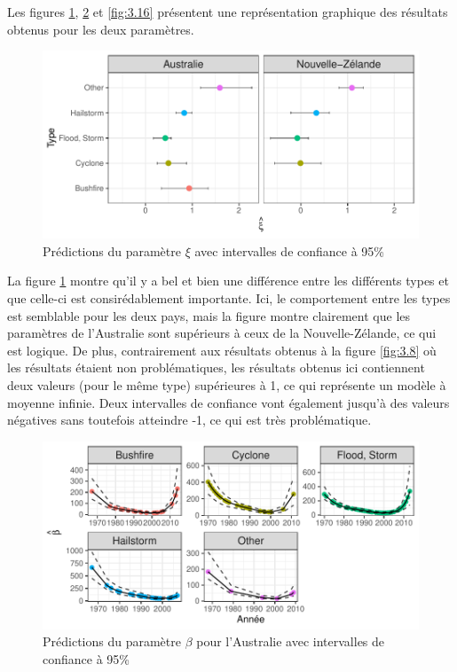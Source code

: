 Les figures \ref{fig:3.14}, \ref{fig:3.15} et \ref{fig:3.16} présentent une représentation graphique des résultats obtenus pour les deux paramètres.
\begin{figure}[h]
\begin{center}
\includegraphics{images/fig-026}
\end{center}
\caption{Prédictions du paramètre $\xi$ avec intervalles de confiance à 95\%}
\label{fig:3.14}
\end{figure}

La figure \ref{fig:3.14} montre qu'il y a bel et bien une différence entre les différents types et que celle-ci est consirédablement importante. Ici, le comportement entre les types est semblable pour les deux pays, mais la figure montre clairement que les paramètres de l'Australie sont supérieurs à ceux de la Nouvelle-Zélande, ce qui est logique. De plus, contrairement aux résultats obtenus à la figure \ref{fig:3.8} où les résultats étaient non problématiques, les résultats obtenus ici contiennent deux valeurs (pour le même type) supérieures à 1, ce qui représente un modèle à moyenne infinie. Deux intervalles de confiance vont également jusqu'à des valeurs négatives sans toutefois atteindre -1, ce qui est très problématique.
\\

\begin{figure}[h]
\begin{center}
\includegraphics{images/fig-027}
\end{center}
\caption{Prédictions du paramètre $\beta$ pour l'Australie avec intervalles de confiance à 95\%}
\label{fig:3.15}
\end{figure}


